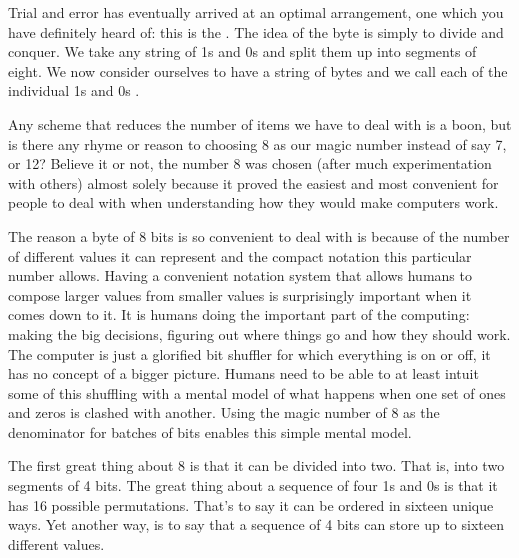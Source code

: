 Trial and error has eventually arrived at an optimal arrangement, one which
you have definitely heard of: this is the . The idea of the byte
is simply to divide and conquer. We take any string of 1s and 0s and split
them up into segments of eight. We now consider ourselves to have a string
of bytes and we call each of the individual 1s and 0s . 

Any scheme that reduces the number of items we have to deal with is a boon,
but is there any rhyme or reason to choosing 8 as our magic number instead
of say 7, or 12? Believe it or not, the number 8 was chosen 
(after much experimentation with others) almost solely because it proved the easiest and
most convenient for people to deal with when understanding how they would
make computers work.

The reason a byte of 8 bits is so convenient to deal with is because of
the number of different values it can represent and the compact notation
this particular number allows. Having a convenient notation system that
allows humans to compose larger values from smaller values is surprisingly
important when it comes down to it. It is humans doing the important part
of the computing: making the big decisions, figuring out where things go
and how they should work. The computer is just a glorified bit shuffler
for which everything is on or off, it has no concept of a bigger picture. Humans
need to be able to at least intuit some of this shuffling with a mental
model of what happens when one set of ones and zeros is clashed with another.
Using the magic number of 8 as the denominator for batches of bits enables
this simple mental model.

The first great thing about 8 is that it can be divided into two. That is,
into two segments of 4 bits. The great thing about a sequence of four 1s
and 0s is that it has 16 possible permutations. That's to say it can be
ordered in sixteen unique ways. Yet another way, is to say that a sequence
of 4 bits can store up to sixteen different values.

